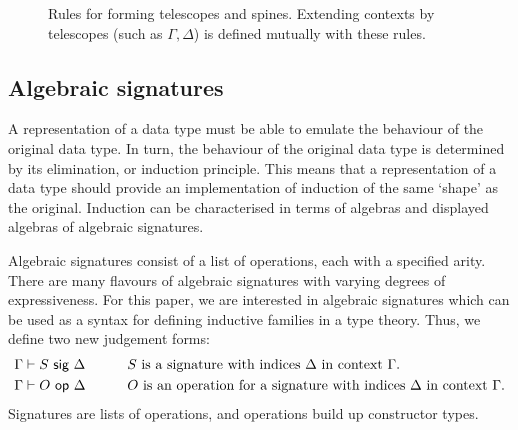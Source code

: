 \begin{figure}[H]
  \caption{Rules for forming telescopes and spines. Extending contexts by
  telescopes (such as $\Gamma, \Delta$) is defined mutually with these rules.}
\end{figure}




\newcommand{\ValidCase}{\mta{ValidCase}}

\subsection{Algebraic signatures}

A representation of a data type must be able to emulate the behaviour of the
original data type. In turn, the behaviour of the original data type is
determined by its elimination, or induction principle. This means that a
representation of a data type should provide an implementation of induction of
the same `shape' as the original. Induction can be characterised in terms of
algebras and displayed algebras of algebraic signatures.

Algebraic signatures \cite{Adamek2010-ls,Kovacs2023-gq} consist of a list of operations, each with a specified
arity. There are many flavours of algebraic signatures with varying degrees of
expressiveness. For this paper, we are interested in algebraic signatures which can
be used as a syntax for defining inductive families in a type theory. Thus, we define
two new judgement forms:
\begin{alignat*}{2}
&\Gamma \vdash S \ \textsf{sig}\  \Delta  && \qquad \text{$S$ is a signature with indices $\Delta$ in context $\Gamma$.} \\
&\Gamma \vdash O \ \textsf{op}\  \Delta   && \qquad \text{$O$ is an operation for a signature with indices $\Delta$ in context $\Gamma$.}
\end{alignat*}
Signatures are lists of operations, and operations build up constructor types.

